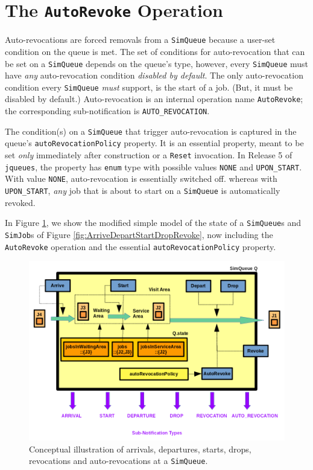 \section{The \texttt{\bf AutoRevoke} Operation}
\label{sec:auto-revocations}

Auto-revocations are forced removals from a \lstinline|SimQueue|
  because a user-set condition on the queue is met.
The set of conditions for auto-revocation
  that can be set on a \lstinline|SimQueue|
  depends on the queue's type,
  however,
  every \lstinline|SimQueue|
  must have {\em any\/}
  auto-revocation condition
  {\em disabled by default}.
The only auto-revocation condition
  every \lstinline|SimQueue| {\em must\/}
  support, is the start of a job.
(But, it must be disabled by default.)
Auto-revocation is an internal operation
  name \lstinline|AutoRevoke|;
  the corresponding sub-notification is
  \lstinline|AUTO_REVOCATION|.

The condition(s) on a \lstinline|SimQueue|
  that trigger auto-revocation is captured
  in the queue's \lstinline|autoRevocationPolicy|
  property.
It is an essential property,
  meant to be set {\em only\/}
  immediately after construction or
  a \lstinline|Reset| invocation.
In Release 5 of \lstinline|jqueues|,
  the property has \lstinline|enum| type
  with possible values \lstinline|NONE|
  and \lstinline|UPON_START|.
With value \lstinline|NONE|,
  auto-revocation is essentially switched off.
  whereas with \lstinline|UPON_START|,
  {\em any\/} job that is about to start
  on a \lstinline|SimQueue| is automatically
  revoked.
  
In Figure \ref{fig:ArriveDepartStartDropRevokeAutoRevoke},
  we show the modified simple model of the state of
  a \lstinline|SimQueue|s
  and \lstinline|SimJob|s of Figure \ref{fig:ArriveDepartStartDropRevoke},
  now including the \lstinline|AutoRevoke| operation
  and the essential \lstinline|autoRevocationPolicy|
  property.

\begin{figure}[!htbp]
\label{fig:ArriveDepartStartDropRevokeAutoRevoke}
\caption{Conceptual illustration
         of arrivals, departures, starts,
         drops, revocations and auto-revocations
         at a \texttt{SimQueue}.}
\includegraphics[width=\textwidth]{fig/ArriveDepartStartDropRevokeAutoRevoke}
\end{figure}
  
